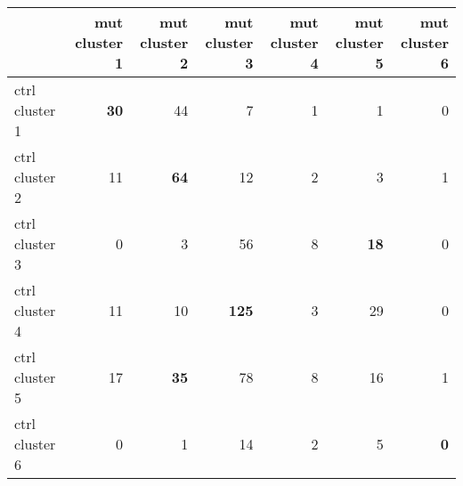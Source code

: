 \begin{tabular}{l|rrrrrr}
 & mut cluster 1 & mut cluster 2 & mut cluster 3 & mut cluster 4 & mut cluster 5 & mut cluster 6 \\
\hline
ctrl cluster 1 & \cellcolor{lightgray} \bfseries 30 & 44 & 7 & 1 & 1 & 0 \\
ctrl cluster 2 & 11 & \cellcolor{lightgray} \bfseries 64 & 12 & 2 & 3 & 1 \\
ctrl cluster 3 & 0 & 3 & 56 & 8 & \cellcolor{lightgray} \bfseries 18 & 0 \\
ctrl cluster 4 & 11 & 10 & \cellcolor{lightgray} \bfseries 125 & 3 & 29 & 0 \\
ctrl cluster 5 & 17 & \cellcolor{lightgray} \bfseries 35 & 78 & 8 & 16 & 1 \\
ctrl cluster 6 & 0 & 1 & 14 & 2 & 5 & \cellcolor{lightgray} \bfseries 0 \\
\end{tabular}
